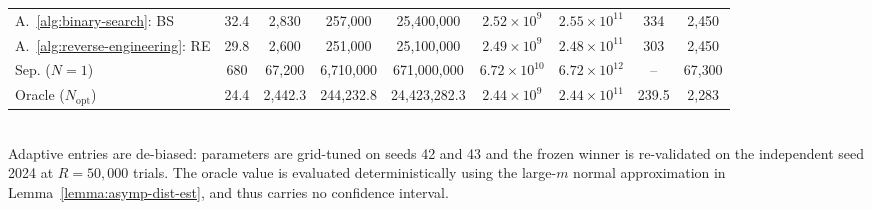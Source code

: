 \begin{table}[ht]
\begin{tabular}{l c c c c c c c c}
A.~\ref{alg:binary-search}: BS
& 32.4
& 2{,}830
& 257{,}000
& 25{,}400{,}000
& $2.52\times10^{9}$
& $2.55\times10^{11}$
& 334
& 2{,}450 \\
A.~\ref{alg:reverse-engineering}: RE
& 29.8
& 2{,}600
& 251{,}000
& 25{,}100{,}000
& $2.49\times10^{9}$
& $2.48\times10^{11}$
& 303
& 2{,}450 \\
\midrule
Sep. ($N=1$)
& 680
& 67{,}200
& 6{,}710{,}000
& 671{,}000{,}000
& $6.72\times10^{10}$
& $6.72\times10^{12}$
& --
& 67{,}300 \\
\midrule
Oracle ($N_\text{opt}$)
& 24.4
& 2{,}442.3
& 244{,}232.8
& 24{,}423{,}282.3
& $2.44\times10^{9}$
& $2.44\times10^{11}$
& 239.5
& 2{,}283 \\
\bottomrule
\end{tabular}
\\[2pt]
\footnotesize Adaptive entries are de-biased: parameters are grid-tuned on seeds 42 and 43 and the frozen winner is re-validated on the independent seed 2024 at $R=50{,}000$ trials. The oracle value is evaluated deterministically using the large-$m$ normal approximation in Lemma~\ref{lemma:asymp-dist-est}, and thus carries no confidence interval.
\end{table}
